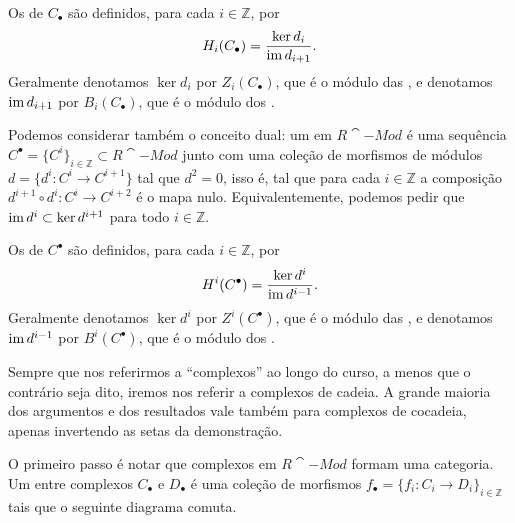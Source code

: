Os  de $C_\bullet$ são definidos, para cada $i \in \mathbb{Z}$, por \begin{equation}
    H_i(C_\bullet) = \frac{\ker d_i}{\operatorname{im} d_{i+1}}.
\end{equation} Geralmente denotamos $\ker d_i$ por $Z_i(C_\bullet)$, que é o módulo das , e denotamos $\operatorname{im} d_{i+1}$ por $B_i(C_\bullet)$, que é o módulo dos .

Podemos considerar também o conceito dual: um  em $R\cat{-Mod}$ é uma sequência $C^\bullet = \{C^i\}_{i \in \mathbb{Z}} \subset R\cat{-Mod}$ junto com uma coleção de morfismos de módulos $d = \{d^i \colon C^i \to C^{i + 1}\}$ tal que $d^2 = 0$, isso é, tal que para cada $i \in \mathbb{Z}$ a composição $d^{i + 1} \circ d^i \colon C^i \to C^{i + 2}$ é o mapa nulo. Equivalentemente, podemos pedir que $\operatorname{im} d^i \subset \ker d^{i + 1}$ para todo $i \in \mathbb{Z}$.

Os  de $C^\bullet$ são definidos, para cada $i \in \mathbb{Z}$, por \begin{equation}
    H^i(C^\bullet) = \frac{\ker d^i}{\operatorname{im} d^{i - 1}}.
\end{equation} Geralmente denotamos $\ker d^i$ por $Z^i(C^\bullet)$, que é o módulo das , e denotamos $\operatorname{im} d^{i-1}$ por $B^i(C^\bullet)$, que é o módulo dos .

Sempre que nos referirmos a ``complexos'' ao longo do curso, a menos que o contrário seja dito, iremos nos referir a complexos de cadeia. A grande maioria dos argumentos e dos resultados vale também para complexos de cocadeia, apenas invertendo as setas da demonstração.

O primeiro passo é notar que complexos em $R\cat{-Mod}$ formam uma categoria. Um  entre complexos $C_\bullet$ e $D_\bullet$ é uma coleção de morfismos $f_\bullet = \{f_i \colon C_i \to D_i\}_{i \in \mathbb{Z}}$ tais que o seguinte diagrama comuta.

\begin{center}
\end{center}


